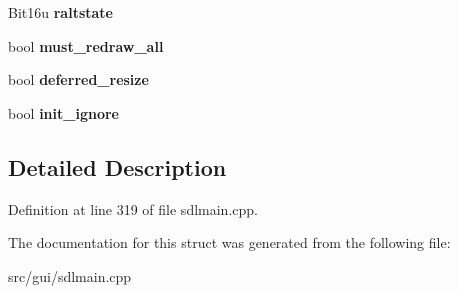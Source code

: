 \begin{DoxyCompactItemize}
\item 
\hypertarget{structSDL__Block_af7879512344af9287ab4b81097e0c726}{Bit16u {\bfseries raltstate}}\label{structSDL__Block_af7879512344af9287ab4b81097e0c726}

\item 
\hypertarget{structSDL__Block_aa0cb013ccdf7ee39c26ec18115431b1c}{bool {\bfseries must\-\_\-redraw\-\_\-all}}\label{structSDL__Block_aa0cb013ccdf7ee39c26ec18115431b1c}

\item 
\hypertarget{structSDL__Block_a079d996afce9d74628a5709b2f37bd2b}{bool {\bfseries deferred\-\_\-resize}}\label{structSDL__Block_a079d996afce9d74628a5709b2f37bd2b}

\item 
\hypertarget{structSDL__Block_af2f09abf4659afabea0f94eb03dfc63a}{bool {\bfseries init\-\_\-ignore}}\label{structSDL__Block_af2f09abf4659afabea0f94eb03dfc63a}

\end{DoxyCompactItemize}


\subsection{Detailed Description}


Definition at line 319 of file sdlmain.\-cpp.



The documentation for this struct was generated from the following file\-:\begin{DoxyCompactItemize}
\item 
src/gui/sdlmain.\-cpp\end{DoxyCompactItemize}
